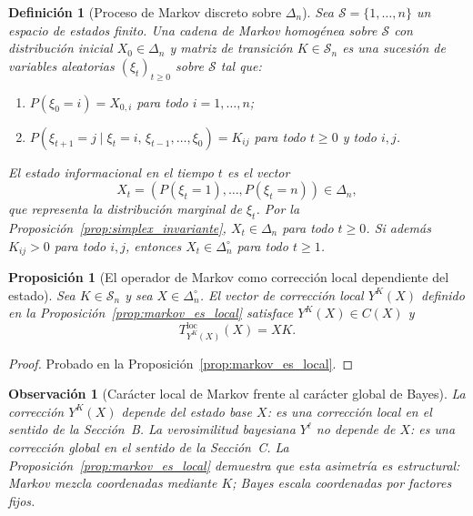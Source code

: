 ﻿\documentclass[12pt]{article}
\newtheorem{definicion}{Definición}[section]
\newtheorem{proposicion}{Proposición}[section]
\newtheorem{observacion}{Observación}[section]
\begin{document}
\begin{definicion}[Proceso de Markov discreto sobre $\Delta_n$]\label{def:proceso_markov}
Sea $\mathcal{S} = \{1,\dots,n\}$ un espacio de estados finito. Una \emph{cadena de Markov homogénea} sobre $\mathcal{S}$ con distribución inicial $X_0 \in \Delta_n$ y matriz de transición $K \in \mathcal{S}_n$ es una sucesión de variables aleatorias $(\xi_t)_{t\geq 0}$ sobre $\mathcal{S}$ tal que:
\begin{enumerate}[label=\textnormal{(\roman*)}]
    \item $P(\xi_0 = i) = X_{0,i}$ para todo $i=1,\dots,n$;
    \item $P(\xi_{t+1}=j \mid \xi_t=i,\, \xi_{t-1},\dots,\xi_0) = K_{ij}$ para todo $t\geq 0$ y todo $i,j$.
\end{enumerate}
El \emph{estado informacional en el tiempo $t$} es el vector
\[
X_t = (P(\xi_t=1),\dots,P(\xi_t=n)) \in \Delta_n,
\]
que representa la distribución marginal de $\xi_t$. Por la Proposición~\ref{prop:simplex_invariante}, $X_t\in\Delta_n$ para todo $t\ge 0$. Si además $K_{ij}>0$ para todo $i,j$, entonces $X_t\in\Delta_n^\circ$ para todo $t\ge 1$.
\end{definicion}

\begin{proposicion}[El operador de Markov como corrección local dependiente del estado]\label{prop:markov_como_CI}
Sea $K \in \mathcal{S}_n$ y sea $X \in \Delta_n^\circ$. El vector de corrección local $Y^K(X)$ definido en la Proposición~\ref{prop:markov_es_local} satisface $Y^K(X) \in C(X)$ y
\[
T^{\mathrm{loc}}_{Y^K(X)}(X) = XK.
\]
\end{proposicion}

\begin{proof}
Probado en la Proposición~\ref{prop:markov_es_local}.
\end{proof}

\begin{observacion}[Carácter local de Markov frente al carácter global de Bayes]\label{obs:local_vs_global_markov_bayes}
La corrección $Y^K(X)$ depende del estado base $X$: es una corrección \emph{local} en el sentido de la Sección~B. La verosimilitud bayesiana $Y^\ell$ no depende de $X$: es una corrección \emph{global} en el sentido de la Sección~C. La Proposición~\ref{prop:markov_es_local} demuestra que esta asimetría es estructural: Markov mezcla coordenadas mediante $K$; Bayes escala coordenadas por factores fijos.
\end{observacion}
\end{document}
